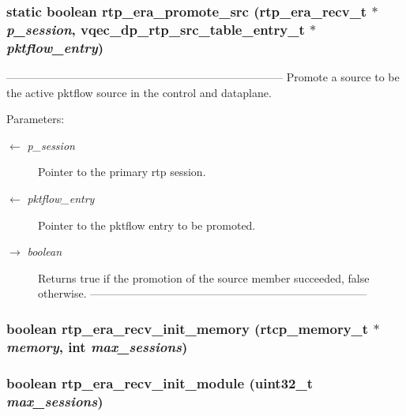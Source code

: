 \subsubsection{\setlength{\rightskip}{0pt plus 5cm}static boolean rtp\_\-era\_\-promote\_\-src (\bf{rtp\_\-era\_\-recv\_\-t} $\ast$ {\em p\_\-session}, vqec\_\-dp\_\-rtp\_\-src\_\-table\_\-entry\_\-t $\ast$ {\em pktflow\_\-entry})\hspace{0.3cm}{\tt  [static]}}\label{rtp__era__recv_8c_e9d88b1db3ea3af837e1e563c5080c08}


--------------------------------------------------------------------------- Promote a source to be the active pktflow source in the control and dataplane.

\begin{Desc}
\item[Parameters:]
\begin{description}
\item[\mbox{$\leftarrow$} {\em p\_\-session}]Pointer to the primary rtp session. \item[\mbox{$\leftarrow$} {\em pktflow\_\-entry}]Pointer to the pktflow entry to be promoted. \item[\mbox{$\rightarrow$} {\em boolean}]Returns true if the promotion of the source member succeeded, false otherwise. --------------------------------------------------------------------------- \end{description}
\end{Desc}
\subsubsection{\setlength{\rightskip}{0pt plus 5cm}boolean rtp\_\-era\_\-recv\_\-init\_\-memory (rtcp\_\-memory\_\-t $\ast$ {\em memory}, int {\em max\_\-sessions})}\label{rtp__era__recv_8c_e23fc0f9b37bba00d668c2ed89808a33}


\subsubsection{\setlength{\rightskip}{0pt plus 5cm}boolean rtp\_\-era\_\-recv\_\-init\_\-module (uint32\_\-t {\em max\_\-sessions})}\label{rtp__era__recv_8c_45028b37bd2db55724168229a1ae60c7}


